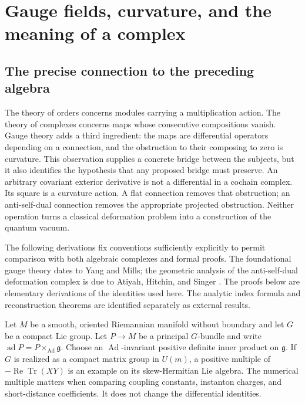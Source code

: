 \chapter{Gauge fields, curvature, and the meaning of a complex}
\label{chap:gauge}

\section{The precise connection to the preceding algebra}

The theory of orders concerns modules carrying a multiplication action.  The
theory of complexes concerns maps whose consecutive compositions vanish.  Gauge
theory adds a third ingredient: the maps are differential operators depending on
a connection, and the obstruction to their composing to zero is curvature.
This observation supplies a concrete bridge between the subjects, but it also
identifies the hypothesis that any proposed bridge must preserve.  An arbitrary
covariant exterior derivative is not a differential in a cochain complex.
Its square is a curvature action.  A flat connection removes that obstruction;
an anti-self-dual connection removes the appropriate projected obstruction.
Neither operation turns a classical deformation problem into a construction of
the quantum vacuum.

The following derivations fix conventions sufficiently explicitly to permit
comparison with both algebraic complexes and formal proofs.  The foundational
gauge theory dates to Yang and Mills; the geometric analysis of the
anti-self-dual deformation complex is due to Atiyah, Hitchin, and Singer
\cite{YM1954,AHS1978}.  The proofs below are elementary derivations of the
identities used here.  The analytic index formula and reconstruction theorems
are identified separately as external results.

Let $M$ be a smooth, oriented Riemannian manifold without boundary and let
$G$ be a compact Lie group.  Let $P\to M$ be a principal $G$-bundle and write
$\operatorname{ad}P=P\times_{\operatorname{Ad}}\mathfrak g$.  Choose an
$\operatorname{Ad}$-invariant positive definite inner product on
$\mathfrak g$.  If $G$ is realized as a compact matrix group in $U(m)$, a
positive multiple of $-\operatorname{Re}\operatorname{Tr}(XY)$ is an example
on its skew-Hermitian Lie algebra.  The numerical multiple matters when
comparing coupling constants, instanton charges, and short-distance
coefficients.  It does not change the differential identities.

